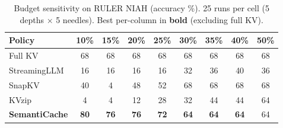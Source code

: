 
\begin{table}[t]
\caption{Budget sensitivity on RULER NIAH (accuracy \%).
25 runs per cell (5 depths $\times$ 5 needles).
Best per-column in \textbf{bold} (excluding full KV).}
\label{tab:budget}
\centering
\setlength{\tabcolsep}{3.5pt}
\begin{tabular}{lcccccccc}
\toprule
Policy & 10\% & 15\% & 20\% & 25\% & 30\% & 35\% & 40\% & 50\% \\
\midrule
Full KV                       & 68 & 68 & 68 & 68 & 68 & 68 & 68 & 68 \\
StreamingLLM                  & 16 & 16 & 16 & 16 & 32 & 36 & 40 & 36 \\
SnapKV                        & 40 &  4 & 48 & 52 & 68 & 68 & 68 & 68 \\
KVzip                         &  4 &  4 & 12 & 28 & 32 & 44 & 44 & 64 \\
\textbf{SemantiCache}         & \textbf{80} & \textbf{76} & \textbf{76} & \textbf{72} & \textbf{64} & \textbf{64} & \textbf{64} & 64 \\
\bottomrule
\end{tabular}
\end{table}






%
